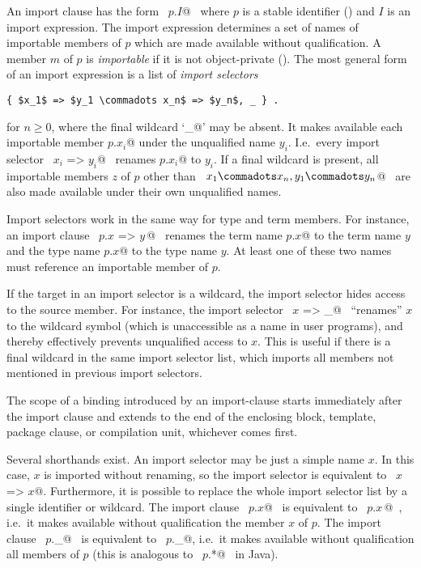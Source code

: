 An import clause has the form ~\lstinline@import $p$.$I$@~ where $p$ is a stable
identifier () and $I$ is an import expression.
The import expression determines a set of names of importable members of $p$
which are made available without qualification.  A member $m$ of $p$ is
{\em importable} if it is not object-private ().
The most general form of an import expression is a list of {\em import
selectors}
\begin{lstlisting}
{ $x_1$ => $y_1 \commadots x_n$ => $y_n$, _ } .
\end{lstlisting}
for $n \geq 0$, where the final wildcard `\lstinline@_@' may be absent.  It
makes available each importable member \lstinline@$p$.$x_i$@ under the unqualified name
$y_i$. I.e.\ every import selector ~\lstinline@$x_i$ => $y_i$@~ renames
\lstinline@$p$.$x_i$@ to
$y_i$.  If a final wildcard is present, all importable members $z$ of
$p$ other than ~\lstinline@$x_1 \commadots x_n,y_1 \commadots y_n$@~ are also made available
under their own unqualified names.

Import selectors work in the same way for type and term members. For
instance, an import clause ~\lstinline@import $p$.{$x$ => $y\,$}@~ renames the term
name \lstinline@$p$.$x$@ to the term name $y$ and the type name \lstinline@$p$.$x$@
to the type name $y$. At least one of these two names must
reference an importable member of $p$.

If the target in an import selector is a wildcard, the import selector
hides access to the source member. For instance, the import selector
~\lstinline@$x$ => _@~ ``renames'' $x$ to the wildcard symbol (which is
unaccessible as a name in user programs), and thereby effectively
prevents unqualified access to $x$. This is useful if there is a
final wildcard in the same import selector list, which imports all
members not mentioned in previous import selectors.

The scope of a binding introduced by an import-clause starts
immediately after the import clause and extends to the end of the
enclosing block, template, package clause, or compilation unit,
whichever comes first.

Several shorthands exist. An import selector may be just a simple name
$x$. In this case, $x$ is imported without renaming, so the
import selector is equivalent to ~\lstinline@$x$ => $x$@. Furthermore, it is
possible to replace the whole import selector list by a single
identifier or wildcard. The import clause ~\lstinline@import $p$.$x$@~ is
equivalent to ~\lstinline@import $p$.{$x\,$}@~, i.e.\ it makes available without
qualification the member $x$ of $p$. The import clause
~\lstinline@import $p$._@~ is equivalent to
~\lstinline@import $p$.{_}@, 
i.e.\ it makes available without qualification all members of $p$
(this is analogous to ~\lstinline@import $p$.*@~ in Java).

